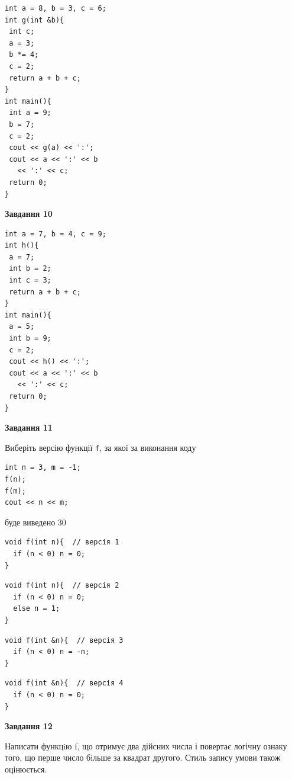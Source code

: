 \documentclass[12pt, ukrainian]{article}
\def\code#1{\Verb!#1!}
\begin{document}
{\begin {large}
\begin{minipage}[t]{7.0cm}
\begin{verbatim}
int a = 8, b = 3, c = 6;
int g(int &b){
 int c;
 a = 3;
 b *= 4;
 c = 2;
 return a + b + c;
}
int main(){
 int a = 9;
 b = 7;
 c = 2;
 cout << g(a) << ':';
 cout << a << ':' << b 
   << ':' << c;
 return 0;
}
\end{verbatim}



\begin{center}
\textbf{Завдання 10}
\end{center}
\vspace{-8mm}

\begin{verbatim}
int a = 7, b = 4, c = 9;
int h(){
 a = 7;
 int b = 2;
 int c = 3;
 return a + b + c;
}
int main(){
 a = 5;
 int b = 9;
 c = 2;
 cout << h() << ':';
 cout << a << ':' << b 
   << ':' << c;
 return 0;
}
\end{verbatim}

\end{minipage}
\vline \hspace{1mm}
\begin{minipage}[t]{11.0cm}

\begin{center}
\textbf{Завдання 11}
\end{center}
Виберіть версію функції \code{f}, за якої за виконання коду
\begin{verbatim}
int n = 3, m = -1;
f(n);
f(m);
cout << n << m;
\end{verbatim}

буде виведено 30

\begin{verbatim}
void f(int n){  // версія 1
  if (n < 0) n = 0;
}
\end{verbatim}

\vspace{-8mm}\begin{verbatim}
void f(int n){  // версія 2
  if (n < 0) n = 0;
  else n = 1;
}
\end{verbatim}

\vspace{-8mm}\begin{verbatim}
void f(int &n){  // версія 3
  if (n < 0) n = -n;
}
\end{verbatim}

\vspace{-8mm}\begin{verbatim}
void f(int &n){  // версія 4
  if (n < 0) n = 0;
}
\end{verbatim}



\begin{center}
\textbf{Завдання 12}
\end{center}

Написати функцiю f, що отримує два дійсних числа і повертає логічну ознаку того, що перше число бiльше за квадрат другого. Стиль запису умови також оцінюється.\par

\end{minipage}

\end {large}}
\newpage
\end{document}

